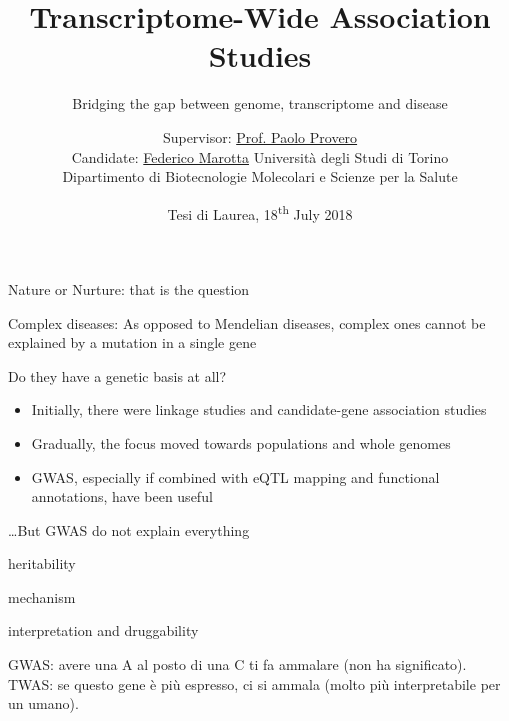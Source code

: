 \documentclass[aspectratio=169,12pt]{beamer}
\title{Transcriptome-Wide Association Studies}
\subtitle{\footnotesize Bridging the gap between genome, transcriptome 
	and disease}
\author[Federico Marotta]
{
	Supervisor: \href{mailto:paolo.provero@unito.it}{Prof. Paolo 
		Provero}
	\\
	Candidate: \href{mailto:federico.marotta@edu.unito.it}{Federico 
		Marotta}
	\vfill
	\scriptsize
	Università degli Studi di Torino
	\\
	Dipartimento di Biotecnologie Molecolari e Scienze per la Salute
	\vfill
}
\institute[UniTo, DBMSS]
{



}
\date{\tiny Tesi di Laurea, 18\textsuperscript{th} July 2018}
\begin{document}
\maketitle


\begin{frame}{Nature or Nurture: that is the question}

	\bigskip

	\begin{block}{Complex diseases:}
		As opposed to Mendelian diseases, complex ones cannot be 
explained by a mutation in a single gene
	\end{block}

	\bigskip

	Do they have a genetic basis at all?

	\pause

	\begin{itemize}
		\item Initially, there were \alert{linkage studies} and 
\alert{candidate-gene association studies}
		\item Gradually, the focus moved towards \alert{populations and 
whole genomes}
		\item \alert{GWAS}, especially if combined with eQTL mapping and 
functional annotations, have been useful
	 \end{itemize}


\end{frame}

\begin{frame}{\ldots But GWAS do not explain everything}

	heritability

	mechanism

	interpretation and druggability

	GWAS: avere una A al posto di una C ti fa ammalare (non ha 
	significato).
	TWAS: se questo gene è più espresso, ci si ammala (molto più 
	interpretabile per un umano).


\end{frame}
\end{document}
